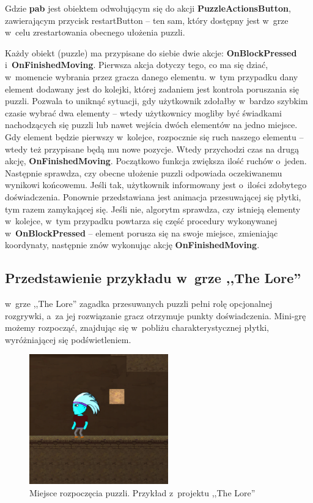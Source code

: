 \documentclass[oneside,polski,logo]{amuthesis}
\begin{document}
Gdzie \textbf{pab} jest obiektem odwołującym się do akcji \textbf{PuzzleActionsButton}, zawierającym przycisk restartButton – ten sam, który dostępny jest w~grze w~celu zrestartowania obecnego ułożenia puzzli.

Każdy obiekt (puzzle) ma przypisane do siebie dwie akcje: \textbf{OnBlockPressed} i~\textbf{OnFinishedMoving}. Pierwsza akcja dotyczy tego, co ma się dziać, w~momencie wybrania przez gracza danego elementu. w~tym przypadku dany element dodawany jest do kolejki, której zadaniem jest kontrola poruszania się puzzli. Pozwala to uniknąć sytuacji, gdy użytkownik zdołałby w~bardzo szybkim czasie wybrać dwa elementy – wtedy użytkownicy mogliby być świadkami nachodzących się puzzli lub nawet wejścia dwóch elementów na jedno miejsce. Gdy element będzie pierwszy w~kolejce, rozpocznie się ruch naszego elementu – wtedy też przypisane będą mu nowe pozycje. Wtedy przychodzi czas na drugą akcję, \textbf{OnFinishedMoving}. Początkowo funkcja zwiększa ilość ruchów o~jeden. Następnie sprawdza, czy obecne ułożenie puzzli odpowiada oczekiwanemu wynikowi końcowemu. Jeśli tak, użytkownik informowany jest o~ilości zdobytego doświadczenia. Ponownie przedstawiana jest animacja przesuwającej się płytki, tym razem zamykającej się. Jeśli nie, algorytm sprawdza, czy istnieją elementy w~kolejce, w~tym przypadku powtarza się część procedury wykonywanej w~\textbf{OnBlockPressed} – element porusza się na swoje miejsce, zmieniając koordynaty, następnie znów wykonując akcję \textbf{OnFinishedMoving}.

\subsection{Przedstawienie przykładu w~grze ,,The Lore''}
\par w~grze ,,The Lore'' zagadka przesuwanych puzzli pełni rolę opcjonalnej rozgrywki, a~za jej rozwiązanie gracz otrzymuje punkty doświadczenia. Mini-grę możemy rozpocząć, znajdując się w~pobliżu charakterystycznej płytki, wyróżniającej się podświetleniem.\begin{figure}[h]
	\centering
	\includegraphics[width=6cm]{images/tyrek/the_lore_puzzle_lvl1.png}
	\caption{Miejsce rozpoczęcia puzzli. Przykład z~projektu ,,The Lore''}
\end{figure}
\end{document}
